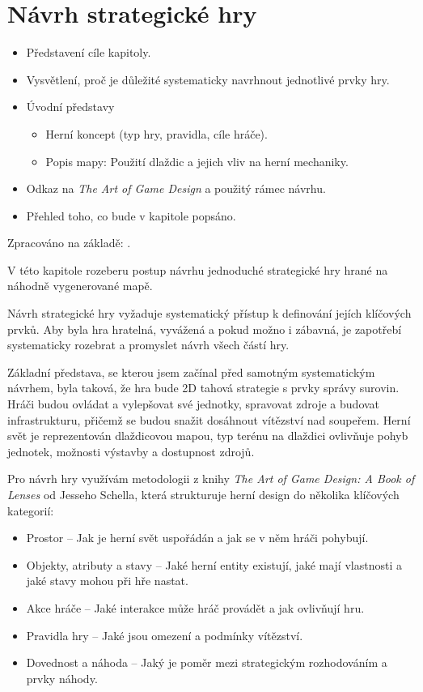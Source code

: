 \section{Návrh strategické hry}

\begin{itemize}
    \item Představení cíle kapitoly.
    \item Vysvětlení, proč je důležité systematicky navrhnout jednotlivé prvky hry.
    \item Úvodní představy
    \begin{itemize}
        \item Herní koncept (typ hry, pravidla, cíle hráče).
        \item Popis mapy: Použití dlaždic a jejich vliv na herní mechaniky.
    \end{itemize}
    \item Odkaz na \textit{The Art of Game Design} a použitý rámec návrhu.
    \item Přehled toho, co bude v kapitole popsáno.
\end{itemize}

Zpracováno na základě: \cite{} \cite{} \cite{}.

V této kapitole rozeberu postup návrhu jednoduché strategické hry hrané na náhodně vygenerované mapě.

Návrh strategické hry vyžaduje systematický přístup k definování jejích klíčových prvků. Aby byla hra hratelná, vyvážená a pokud možno i zábavná, je zapotřebí systematicky rozebrat a promyslet návrh všech částí hry. 

Základní představa, se kterou jsem začínal před samotným systematickým návrhem, byla taková, že hra bude 2D tahová strategie s prvky správy surovin. Hráči budou ovládat a vylepšovat své jednotky, spravovat zdroje a budovat infrastrukturu, přičemž se budou snažit dosáhnout vítězství nad soupeřem. Herní svět je reprezentován dlaždicovou mapou, typ terénu na dlaždici ovlivňuje pohyb jednotek, možnosti výstavby a dostupnost zdrojů.

Pro návrh hry využívám metodologii z knihy \textit{The Art of Game Design: A Book of Lenses} od Jesseho Schella, která strukturuje herní design do několika klíčových kategorií:

\begin{itemize}
    \item Prostor -- Jak je herní svět uspořádán a jak se v něm hráči pohybují.
    \item Objekty, atributy a stavy -- Jaké herní entity existují, jaké mají vlastnosti a jaké stavy mohou při hře nastat.
    \item Akce hráče -- Jaké interakce může hráč provádět a jak ovlivňují hru.
    \item Pravidla hry -- Jaké jsou omezení a podmínky vítězství.
    \item Dovednost a náhoda -- Jaký je poměr mezi strategickým rozhodováním a prvky náhody.
\end{itemize}

